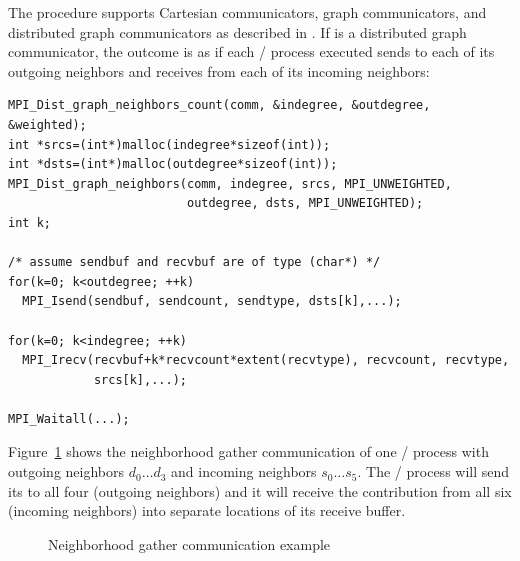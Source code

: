 \begin{sloppy}
The  procedure supports Cartesian communicators, graph communicators, and
distributed graph communicators as described
in .
If  is a distributed graph communicator, the outcome is as
if each \MPI/ process executed sends to each of its outgoing neighbors and
receives from each of its incoming neighbors:

\end{sloppy}
\begin{lstlisting}[language={[MPI]C}]
MPI_Dist_graph_neighbors_count(comm, &indegree, &outdegree, &weighted);
int *srcs=(int*)malloc(indegree*sizeof(int));
int *dsts=(int*)malloc(outdegree*sizeof(int));
MPI_Dist_graph_neighbors(comm, indegree, srcs, MPI_UNWEIGHTED,
                         outdegree, dsts, MPI_UNWEIGHTED);
int k;

/* assume sendbuf and recvbuf are of type (char*) */
for(k=0; k<outdegree; ++k) 
  MPI_Isend(sendbuf, sendcount, sendtype, dsts[k],...); 

for(k=0; k<indegree; ++k) 
  MPI_Irecv(recvbuf+k*recvcount*extent(recvtype), recvcount, recvtype,
            srcs[k],...); 

MPI_Waitall(...);
\end{lstlisting}

Figure~\ref{fig:sparsegather} shows the neighborhood gather
communication of one \MPI/ process with outgoing neighbors $d_0\ldots d_3$ and
incoming neighbors $s_0\ldots s_5$. The \MPI/ process will send its
 to all four  (outgoing neighbors)
and it will receive the contribution from all six 
(incoming neighbors) into separate locations of its receive buffer.


\begin{figure}[t!]
  \centerline{}
  \caption{Neighborhood gather communication example}
  \label{fig:sparsegather}
\end{figure}

